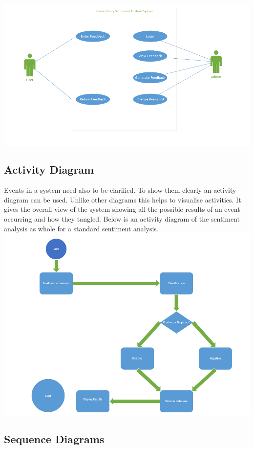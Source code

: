 \documentclass[12pt]{report}
\begin{document}
		\includegraphics[scale=0.5]{usecase.PNG}
	
	\subsection{Activity Diagram}
Events in a system need also to be clarified. To show them clearly an activity diagram can be used. Unlike other diagrams this helps to visualise activities. It gives the overall view of the system showing all the possible results of an event occurring and how they tangled. Below is an activity diagram of the sentiment analysis as whole for a standard sentiment analysis.\\

\includegraphics[scale=0.5]{activity.PNG}

\subsection{Sequence Diagrams}
\end{document}
